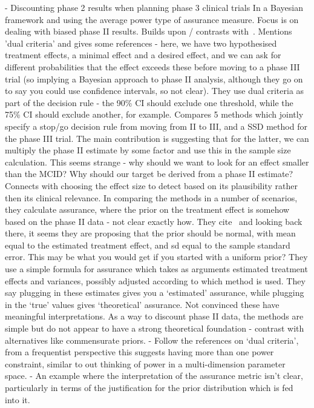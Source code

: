 \documentclass{article} %
\begin{document}
\cite{Kirby2012} - Discounting phase 2 results when planning phase 3 clinical trials
In a Bayesian framework and using the average power type of assurance measure. Focus is on dealing with biased phase II results. Builds upon / contrasts with~\cite{Wang2006}. Mentions 'dual criteria' and gives some references - here, we have two hypothesised treatment effects, a minimal effect and a desired effect, and we can ask for different probabilities that the effect exceeds these before moving to a phase III trial (so implying a Bayesian approach to phase II analysis, although they go on to say you could use confidence intervals, so not clear). They use dual criteria as part of the decision rule - the 90\% CI should exclude one threshold, while the 75\% CI should exclude another, for example. Compares 5 methods which jointly specify a stop/go decision rule from moving from II to III, and a SSD method for the phase III trial. The main contribution is suggesting that for the latter, we can multiply the phase II estimate by some factor and use this in the sample size calculation. This seems strange - why should we want to look for an effect smaller than the MCID? Why should our target be derived from a phase II estimate? Connects with choosing the effect size to detect based on its plausibility rather then its clinical relevance. In comparing the methods in a number of scenarios, they calculate assurance, where the prior on the treatment effect is somehow based on the phase II data - not clear exactly how. They cite~\cite{OHagan2005} and looking back there, it seems they are proposing that the prior should be normal, with mean equal to the estimated treatment effect, and sd equal to the sample standard error. This may be what you would get if you started with a uniform prior? They use a simple formula for assurance which takes as arguments estimated treatment effects and variances, possibly adjusted according to which method is used. They say plugging in these estimates gives you a `estimated' assurance, while plugging in the `true' values gives `theoretical' assurance. Not convinced these have meaningful interpretations. As a way to discount phase II data, the methods are simple but do not appear to have a strong theoretical foundation - contrast with alternatives like commensurate priors.
- Follow the references on `dual criteria', from a frequentist perspective this suggests having more than one power constraint, similar to out thinking of power in a multi-dimension parameter space.
- An example where the interpretation of the assurance metric isn't clear, particularly in terms of the justification for the prior distribution which is fed into it.
\end{document}

